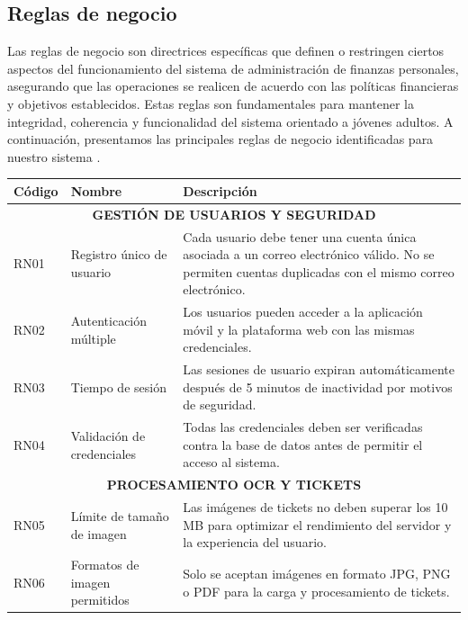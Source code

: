 
\subsection{Reglas de negocio}
Las reglas de negocio son directrices específicas que definen o restringen ciertos aspectos del funcionamiento del sistema de administración de finanzas personales, asegurando que las operaciones se realicen de acuerdo con las políticas financieras y objetivos establecidos. Estas reglas son fundamentales para mantener la integridad, coherencia y funcionalidad del sistema orientado a jóvenes adultos. A continuación, presentamos las principales reglas de negocio identificadas para nuestro sistema \cite{ReglasNegocio}.

\begin{table}[H]
\centering
\renewcommand{\arraystretch}{1.2}
\begin{tabularx}{\textwidth}{@{} l l X @{}}
\toprule
\textbf{Código} & \textbf{Nombre} & \textbf{Descripción} \\
\midrule

\multicolumn{3}{c}{\textbf{GESTIÓN DE USUARIOS Y SEGURIDAD}} \\
\midrule

RN01 & Registro único de usuario &
Cada usuario debe tener una cuenta única asociada a un correo electrónico válido. No se permiten cuentas duplicadas con el mismo correo electrónico. \\

RN02 & Autenticación múltiple &
Los usuarios pueden acceder a la aplicación móvil y la plataforma web con las mismas credenciales. \\

RN03 & Tiempo de sesión &
Las sesiones de usuario expiran automáticamente después de 5 minutos de inactividad por motivos de seguridad. \\

RN04 & Validación de credenciales &
Todas las credenciales deben ser verificadas contra la base de datos antes de permitir el acceso al sistema. \\

\midrule
\multicolumn{3}{c}{\textbf{PROCESAMIENTO OCR Y TICKETS}} \\
\midrule

RN05 & Límite de tamaño de imagen &
Las imágenes de tickets no deben superar los 10 MB para optimizar el rendimiento del servidor y la experiencia del usuario. \\

RN06 & Formatos de imagen permitidos &
Solo se aceptan imágenes en formato JPG, PNG o PDF para la carga y procesamiento de tickets. \\


\end{tabularx}
\end{table}
